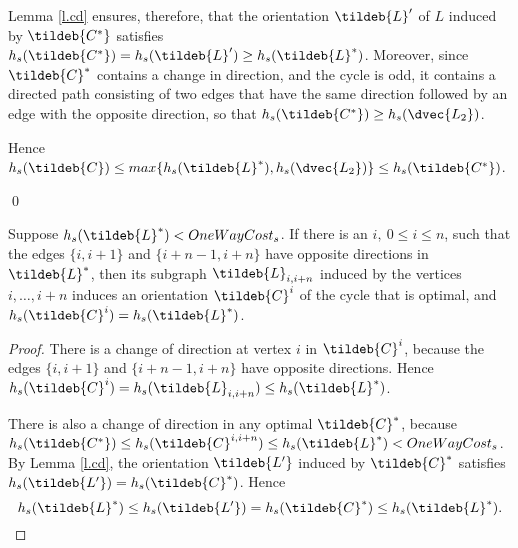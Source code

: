  Lemma \ref{l.cd} ensures, therefore, that the orientation $\tildeb{L}'$ of $L$ 
induced by $\tildeb{C^*}$ satisfies $h_s(\tildeb{C^*})=h_s(\tildeb{L}')\geq h_s(\tildeb{L}^*)$.
Moreover, since $\tildeb{C}^*$ contains a change in direction, and the cycle is odd,
it contains a directed path consisting of two edges that have the same direction followed by an edge with the opposite direction, so that 
$h_s(\tildeb{C^*})\geq h_s(\dvec{L_2})$. 

Hence $h_s(\tildeb{C}) \leq max \{h_s(\tildeb{L}^*), h_s(\dvec{L_2})\} \leq h_s(\tildeb{C^*})$.


\qed

\begin{lemma}\label{l.subo}
	Suppose $h_s(\tildeb{L}^*) < OneWayCost_s$.
	If there is an $i,\ 0\leq i \leq n$, such that the edges $\{i,i+1\}$ and $\{i+n-1,i+n\}$ 
	have opposite directions in $\tildeb{L}^*$,
	then its subgraph $\tildeb{L}_{i,i+n}$ induced by the vertices $i,\ldots,i+n$ induces
	an orientation $\tildeb{C}^{i}$ of the cycle that is optimal, and $h_s(\tildeb{C}^{i})= h_s(\tildeb{L}^*)$.
\end{lemma}
\begin{proof}
	
There is a change of direction at vertex $i$ in $\tildeb{C}^{i}$,
because the edges $\{i,i+1\}$ and $\{i+n-1,i+n\}$ have opposite directions.
Hence $h_s(\tildeb{C}^{i}) =h_s(\tildeb{L}_{i,i+n})\leq h_s(\tildeb{L}^*)$.

There is also a change of direction in any optimal $\tildeb{C}^*$, because 
$h_s(\tildeb{C^*}) \leq h_s(\tildeb{C}^{i, i+n})  \leq h_s(\tildeb{L}^*)<OneWayCost_s$. 
By Lemma \ref{l.cd},  the orientation $\tildeb{L'}$ induced by $\tildeb{C}^*$
satisfies $h_s(\tildeb{L'})= h_s(\tildeb{C}^*)$. Hence
$$h_s(\tildeb{L}^*)\leq h_s(\tildeb{L'})= h_s(\tildeb{C}^*)\leq h_s(\tildeb{L}^*) .$$
\end{proof}

